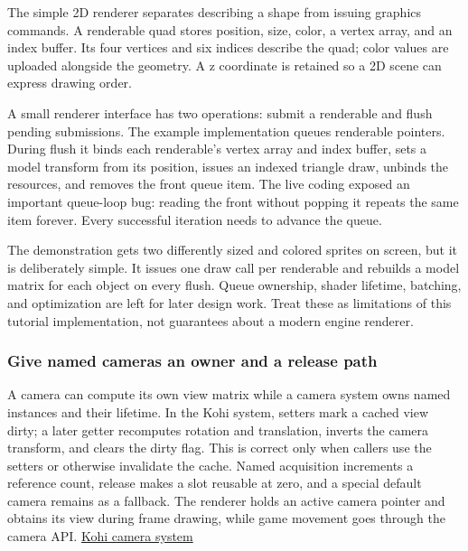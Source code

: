 The simple 2D renderer separates describing a shape from issuing graphics commands. A renderable quad stores position, size, color, a vertex array, and an index buffer. Its four vertices and six indices describe the quad; color values are uploaded alongside the geometry. A z coordinate is retained so a 2D scene can express drawing order.

A small renderer interface has two operations: submit a renderable and flush pending submissions. The example implementation queues renderable pointers. During flush it binds each renderable's vertex array and index buffer, sets a model transform from its position, issues an indexed triangle draw, unbinds the resources, and removes the front queue item. The live coding exposed an important queue-loop bug: reading the front without popping it repeats the same item forever. Every successful iteration needs to advance the queue.

The demonstration gets two differently sized and colored sprites on screen, but it is deliberately simple. It issues one draw call per renderable and rebuilds a model matrix for each object on every flush. Queue ownership, shader lifetime, batching, and optimization are left for later design work. Treat these as limitations of this tutorial implementation, not guarantees about a modern engine renderer.

\subsubsection{Give named cameras an owner and a release path}\label{06-engine-ii-ch025-give-named-cameras-an-owner-and-a-release-path}

\hypertarget{06-engine-ii-ch025-give-named-cameras-an-owner-and-a-release-path}{}

A camera can compute its own view matrix while a camera system owns named instances and their lifetime. In the Kohi system, setters mark a cached view dirty; a later getter recomputes rotation and translation, inverts the camera transform, and clears the dirty flag. This is correct only when callers use the setters or otherwise invalidate the cache. Named acquisition increments a reference count, release makes a slot reusable at zero, and a special default camera remains as a fallback. The renderer holds an active camera pointer and obtains its view during frame drawing, while game movement goes through the camera API. \href{https://www.youtube.com/watch?v=6UMJzh1RdOo}{Kohi camera system}

